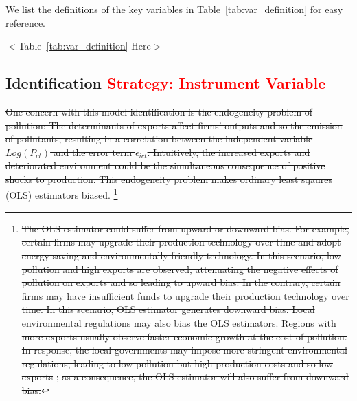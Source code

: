 \documentclass[12pt]{article}
\begin{document}
We list the definitions of the key variables in Table~\ref{tab:var_definition} for easy reference.

\begin{center}
$<$Table~\ref{tab:var_definition} Here$>$
\end{center}

\subsection{Identification \textcolor{red}{Strategy: Instrument Variable}}

\sout{One concern with this model identification is the endogeneity problem of
pollution: The determinants of exports affect firms' outputs and so the
emission of pollutants, resulting in a correlation between the independent
variable $Log(P_{ct})$ and the error term $\epsilon _{ict}$. Intuitively,
the increased exports and deteriorated environment could be the simultaneous
consequence of positive shocks to production. This endogeneity problem makes
ordinary least sqaures (OLS) estimators biased.} \footnote{%
\sout{The OLS estimator could suffer from upward or downward bias. For example,
certain firms may upgrade their production technology over time and adopt
energy-saving and environmentally friendly technology. In this scenario, low
pollution and high exports are observed, attenuating the negative effects of
pollution on exports and so leading to upward bias. In the contrary, certain
firms may have insufficient funds to upgrade their production technology
over time. In this scenario, OLS estimator generates downward bias. Local
environmental regulations may also bias the OLS estimators. Regions with
more exports usually observe faster economic growth at the cost of
pollution. In response, the local governments may impose more stringent
environmental regulations, leading to low pollution but high production
costs and so low exports} \citep{cherniwchan2022environmental,shi2018environmental}; \sout{as a consequence,
the OLS estimator will also suffer from downward bias.}} 
\end{document}
